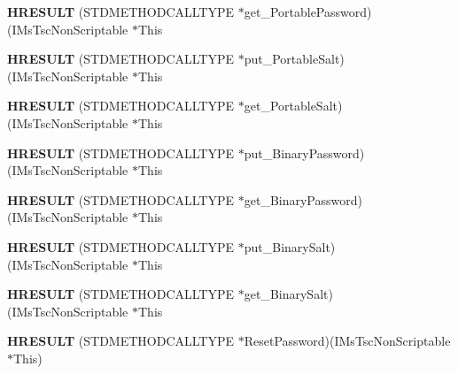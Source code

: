 \begin{DoxyCompactItemize}
{\bfseries H\+R\+E\+S\+U\+LT} (S\+T\+D\+M\+E\+T\+H\+O\+D\+C\+A\+L\+L\+T\+Y\+PE $\ast$get\+\_\+\+Portable\+Password)(I\+Ms\+Tsc\+Non\+Scriptable $\ast$This
\item 
\mbox{\label{struct_i_ms_tsc_non_scriptable_vtbl_a97979cc0cbd5dd9ca593fb0fd8d4912e}} 
{\bfseries H\+R\+E\+S\+U\+LT} (S\+T\+D\+M\+E\+T\+H\+O\+D\+C\+A\+L\+L\+T\+Y\+PE $\ast$put\+\_\+\+Portable\+Salt)(I\+Ms\+Tsc\+Non\+Scriptable $\ast$This
\item 
\mbox{\label{struct_i_ms_tsc_non_scriptable_vtbl_a3033a70f391028d18bb320103570c6a3}} 
{\bfseries H\+R\+E\+S\+U\+LT} (S\+T\+D\+M\+E\+T\+H\+O\+D\+C\+A\+L\+L\+T\+Y\+PE $\ast$get\+\_\+\+Portable\+Salt)(I\+Ms\+Tsc\+Non\+Scriptable $\ast$This
\item 
\mbox{\label{struct_i_ms_tsc_non_scriptable_vtbl_a5f60e364179066e73bf9e2a9bb6bde58}} 
{\bfseries H\+R\+E\+S\+U\+LT} (S\+T\+D\+M\+E\+T\+H\+O\+D\+C\+A\+L\+L\+T\+Y\+PE $\ast$put\+\_\+\+Binary\+Password)(I\+Ms\+Tsc\+Non\+Scriptable $\ast$This
\item 
\mbox{\label{struct_i_ms_tsc_non_scriptable_vtbl_a9d642c188a1148f01752c1917e3d8543}} 
{\bfseries H\+R\+E\+S\+U\+LT} (S\+T\+D\+M\+E\+T\+H\+O\+D\+C\+A\+L\+L\+T\+Y\+PE $\ast$get\+\_\+\+Binary\+Password)(I\+Ms\+Tsc\+Non\+Scriptable $\ast$This
\item 
\mbox{\label{struct_i_ms_tsc_non_scriptable_vtbl_ab5f65e88d836cfb8970e1b2a191ee7e5}} 
{\bfseries H\+R\+E\+S\+U\+LT} (S\+T\+D\+M\+E\+T\+H\+O\+D\+C\+A\+L\+L\+T\+Y\+PE $\ast$put\+\_\+\+Binary\+Salt)(I\+Ms\+Tsc\+Non\+Scriptable $\ast$This
\item 
\mbox{\label{struct_i_ms_tsc_non_scriptable_vtbl_aac1beac908e94f2d8965c2e8be87ecfd}} 
{\bfseries H\+R\+E\+S\+U\+LT} (S\+T\+D\+M\+E\+T\+H\+O\+D\+C\+A\+L\+L\+T\+Y\+PE $\ast$get\+\_\+\+Binary\+Salt)(I\+Ms\+Tsc\+Non\+Scriptable $\ast$This
\item 
\mbox{\label{struct_i_ms_tsc_non_scriptable_vtbl_a093824ddf14dc89d21eb0321d49aa436}} 
{\bfseries H\+R\+E\+S\+U\+LT} (S\+T\+D\+M\+E\+T\+H\+O\+D\+C\+A\+L\+L\+T\+Y\+PE $\ast$Reset\+Password)(I\+Ms\+Tsc\+Non\+Scriptable $\ast$This)

\end{DoxyCompactItemize}
